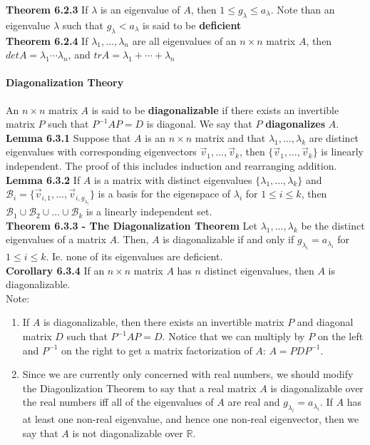 \documentclass[10pt,letter]{article}
\begin{document}
\textbf{Theorem 6.2.3} If $\lambda$ is an eigenvalue of $A$, then $1\leq g_\lambda\leq a_\lambda$. Note than an eigenvalue $\lambda$ such that $g_\lambda<a_\lambda$ is said to be \textbf{deficient}\\ 
\textbf{Theorem 6.2.4} If $\lambda_1,\ldots,\lambda_n$ are all eigenvalues of an $n\times n$ matrix $A$, then $det A=\lambda_1\cdots\lambda_n$, and $trA=\lambda_1+\cdots+\lambda_n$

\paragraph{Diagonalization Theory} An $n\times n$ matrix $A$ is said to be \textbf{diagonalizable} if there exists an invertible matrix $P$ such that $P^{-1}AP=D$ is diagonal. We say that $P$ \textbf{diagonalizes} $A$.\\ 
\textbf{Lemma 6.3.1} Suppose that $A$ is an $n\times n$ matrix and that $\lambda_1,\ldots,\lambda_k$ are distinct eigenvalues with corresponding eigenvectors $\vec{v}_1,\ldots,\vec{v}_k$, then $\{\vec{v}_1,\ldots,\vec{v}_k\}$ is linearly independent. The proof of this includes induction and rearranging addition. \\ 
\textbf{Lemma 6.3.2} If $A$ is a matrix with distinct eigenvalues $\{\lambda_1,\ldots,\lambda_k\}$ and $\mathcal{B}_i=\{\vec{v}_{i,1},\ldots,\vec{v}_{i,g_{\lambda_i}}\}$ is a basis for the eigenspace of $\lambda_i$ for $1\leq i\leq k$, then $\mathcal{B}_1\cup\mathcal{B}_2\cup\ldots\cup\mathcal{B}_k$ is a linearly independent set. \\ 
\textbf{Theorem 6.3.3 - The Diagonalization Theorem} Let $\lambda_1,\ldots,\lambda_k$ be the distinct eigenvalues of a matrix $A$. Then, $A$ is diagonalizable if and only if $g_{\lambda_i}=a_{\lambda_i}$ for $1\leq i\leq k$. Ie. none of its eigenvalues are deficient. \\ 
\textbf{Corollary 6.3.4} If an $n\times n$ matrix $A$ has $n$ distinct eigenvalues, then $A$ is diagonalizable. \\ 
Note: \begin{enumerate}
    \item If $A$ is diagonalizable, then there exists an invertible matrix $P$ and diagonal matrix $D$ such that $P^{-1}AP=D$. Notice that we can multiply by $P$ on the left and $P^{-1}$ on the right to get a matrix factorization of $A$: $A=PDP^{-1}$. 
    \item Since we are currently only concerned with real numbers, we should modify the Diagonlization Theorem to say that a real matrix $A$ is diagonalizable over the real numbers iff all of the eigenvalues of $A$ are real and $g_{\lambda_i}=a_{\lambda_i}$. If $A$ has at least one non-real eigenvalue, and hence one non-real eigenvector, then we say that $A$ is not diagonalizable over $\mathbb{R}$. 
\end{enumerate}
\end{document}
